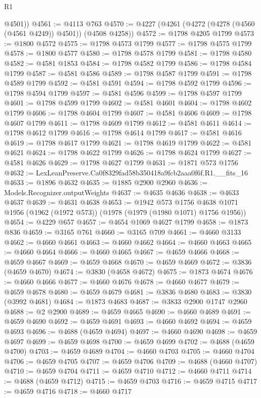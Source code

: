 \begin{lexlean}{R1}
\begin{coremodule}
        @4501))
@4561 := @4113 @763
@4570 := @4227 (@4261 (@4272 (@4278 (@4560 (@4561 @4249)) @4501)) (@4508 @4258))
@4572 := @1798 @4205 @1799
@4573 := @1800 @4572
@4575 := @1798 @4573 @1799
@4577 := @1798 @4575 @1799
@4578 := @1800 @4577
@4580 := @1798 @4578 @1799
@4581 := @1798 @4580
@4582 := @4581 @1853
@4584 := @1798 @4582 @1799
@4586 := @1798 @4584 @1799
@4587 := @4581 @4586
@4589 := @1798 @4587 @1799
@4591 := @1798 @4589 @1799
@4592 := @4581 @4591
@4594 := @1798 @4592 @1799
@4596 := @1798 @4594 @1799
@4597 := @4581 @4596
@4599 := @1798 @4597 @1799
@4601 := @1798 @4599 @1799
@4602 := @4581 @4601
@4604 := @1798 @4602 @1799
@4606 := @1798 @4604 @1799
@4607 := @4581 @4606
@4609 := @1798 @4607 @1799
@4611 := @1798 @4609 @1799
@4612 := @4581 @4611
@4614 := @1798 @4612 @1799
@4616 := @1798 @4614 @1799
@4617 := @4581 @4616
@4619 := @1798 @4617 @1799
@4621 := @1798 @4619 @1799
@4622 := @4581 @4621
@4624 := @1798 @4622 @1799
@4626 := @1798 @4624 @1799
@4627 := @4581 @4626
@4629 := @1798 @4627 @1799
@4631 := @1871 @573 @1756
@4632 := LexLeanPreserve.Ca0f8329fad58b350418a9fcb2aaa0f6f.R1.__fits_16
@4633 := @1896 @4632
@4635 := @1885 @2900 @2960
@4636 := Models.Recognizer.outputWeights
@4637 := @4635 @4636
@4638 := @4633 @4637
@4639 := @4631 @4638
@4653 := @1942
    @573
    @1756
    @4638
    @1071
    @1956
    (@1962 (@1972 @573))
    (@1978 (@1979 (@1980 @1071) @1756 @1956))
@4654 := @4229 @657
@4657 := @4654 @1069 @4627 @1799
@4658 := @1873 @836
@4659 := @3165 @761
@4660 := @3165 @709
@4661 := @4660 @3133
@4662 := @4660 @4661
@4663 := @4660 @4662
@4664 := @4660 @4663
@4665 := @4660 @4664
@4666 := @4660 @4665
@4667 := @4659 @4666
@4668 := @4659 @4667
@4669 := @4659 @4668
@4670 := @4659 @4669
@4672 := @3836 (@4659 @4670)
@4674 := @3830 (@4658 @4672)
@4675 := @1873 @4674
@4676 := @4660 @4666
@4677 := @4660 @4676
@4678 := @4660 @4677
@4679 := @4659 @4678
@4680 := @4659 @4679
@4681 := @3836 @4680
@4683 := @3830 (@3992 @4681)
@4684 := @1873 @4683
@4687 := @3833 @2900 @1747 @2960
@4688 := @2 @2900
@4689 := @4659 @4665
@4690 := @4660 @4689
@4691 := @4659 @4690
@4692 := @4659 @4691
@4693 := @4660 @4692
@4694 := @4659 @4693
@4696 := @4688 (@4659 @4694)
@4697 := @4660 @4690
@4698 := @4659 @4697
@4699 := @4659 @4698
@4700 := @4659 @4699
@4702 := @4688 (@4659 @4700)
@4703 := @4659 @4689
@4704 := @4660 @4703
@4705 := @4660 @4704
@4706 := @4659 @4705
@4707 := @4659 @4706
@4709 := @4688 (@4660 @4707)
@4710 := @4659 @4704
@4711 := @4659 @4710
@4712 := @4660 @4711
@4714 := @4688 (@4659 @4712)
@4715 := @4659 @4703
@4716 := @4659 @4715
@4717 := @4659 @4716
@4718 := @4660 @4717

\end{coremodule}
\end{lexlean}
